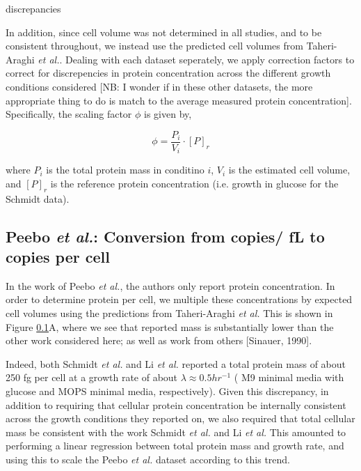 discrepancies \documentclass[11pt, letterpaper]{article}
\begin{document}
In addition, since cell volume was not determined in all studies, and to be
consistent throughout, we instead use the predicted cell volumes from
Taheri-Araghi {\it et al.}. Dealing with each dataset seperately, we apply
correction  factors to correct for discrepencies in protein concentration across
the different growth conditions considered [NB: I wonder if in these other
datasets, the more appropriate thing to do is match to the average measured
protein concentration]. Specifically, the scaling factor $\phi$ is given by,

\begin{equation}
\phi  =  \frac{P_i}{V_i} \cdot [P]_r
\end{equation}

where $P_i$ is the total protein mass in conditino $i$, $V_i$ is the estimated cell volume, and $[P]_r$ is
the reference protein concentration (i.e. growth in  glucose for the Schmidt data).


\subsection{Peebo {\it et al.}: Conversion from copies/ fL to copies per cell}

In the work of Peebo {\it et al.}, the authors only report protein concentration.
In  order to determine protein per cell, we multiple these concentrations by
expected cell volumes  using the predictions from  Taheri-Araghi {\it et al.} This is
shown in Figure \ref{}A, where we see that reported mass is substantially lower than
the other work considered here; as well as work from others [Sinauer, 1990].

Indeed, both Schmidt {\it et al.} and Li {\it et al.} reported a total protein mass of about
250 fg per cell at a growth rate of about $\lambda \approx 0.5 hr^{-1}$ ( M9
minimal media with glucose and MOPS minimal media, respectively). Given this
discrepancy, in addition to requiring that cellular protein concentration be
internally consistent across the growth conditions they reported on, we also
required that total cellular mass be consistent with the work Schmidt {\it et al.} and
Li {\it et al.} This amounted to performing a linear regression between total protein
mass and growth rate, and using this to scale the Peebo {\it et al.} dataset according
to this trend.


\end{document}
